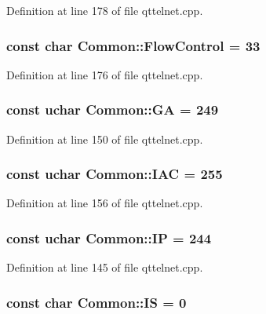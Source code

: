 Definition at line 178 of file qttelnet.cpp.

\hypertarget{namespaceCommon_a842ddcab0cc81f7e1ab007ce54a78202}{
\subsubsection[{FlowControl}]{\setlength{\rightskip}{0pt plus 5cm}const char {\bf Common::FlowControl} = 33}}
\label{namespaceCommon_a842ddcab0cc81f7e1ab007ce54a78202}


Definition at line 176 of file qttelnet.cpp.

\hypertarget{namespaceCommon_a55fe9a0bad3ae7274636fe93ebb89188}{
\subsubsection[{GA}]{\setlength{\rightskip}{0pt plus 5cm}const uchar {\bf Common::GA} = 249}}
\label{namespaceCommon_a55fe9a0bad3ae7274636fe93ebb89188}


Definition at line 150 of file qttelnet.cpp.

\hypertarget{namespaceCommon_a06e20b57f7564a1f62bcefa115d0c195}{
\subsubsection[{IAC}]{\setlength{\rightskip}{0pt plus 5cm}const uchar {\bf Common::IAC} = 255}}
\label{namespaceCommon_a06e20b57f7564a1f62bcefa115d0c195}


Definition at line 156 of file qttelnet.cpp.

\hypertarget{namespaceCommon_a9dc7df4b9c8153a6dfc4697082ccd0af}{
\subsubsection[{IP}]{\setlength{\rightskip}{0pt plus 5cm}const uchar {\bf Common::IP} = 244}}
\label{namespaceCommon_a9dc7df4b9c8153a6dfc4697082ccd0af}


Definition at line 145 of file qttelnet.cpp.

\hypertarget{namespaceCommon_a08a2345f3481ac7dbe5b3a1d751f4824}{
\subsubsection[{IS}]{\setlength{\rightskip}{0pt plus 5cm}const char {\bf Common::IS} = 0}}
\label{namespaceCommon_a08a2345f3481ac7dbe5b3a1d751f4824}


